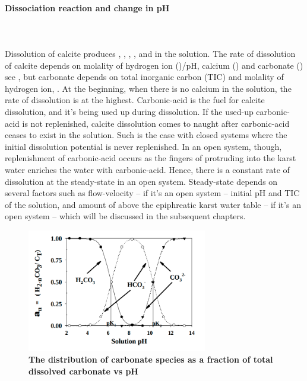 \paragraph*{Dissociation reaction and change in pH}\mbox{}\\ \\
Dissolution of calcite produces , , , , and  in the solution. 
The rate of dissolution of calcite depends on molality of hydrogen ion ()/pH, calcium () and 
carbonate () see , but carbonate depends on total inorganic carbon (TIC) and 
molality of hydrogen ion, . At the beginning, when there is no calcium in the solution, the rate of dissolution is at the highest. 
Carbonic-acid is the fuel for calcite dissolution, and it's being used up during dissolution. 
If the used-up carbonic-acid is not replenished, calcite dissolution comes to naught after carbonic-acid ceases to exist in the solution. 
Such is the case with closed systems where the initial dissolution potential is never replenished. In an open system, though, replenishment of 
carbonic-acid occurs as the fingers of  protruding into the karst water enriches the water with carbonic-acid. Hence, there is a constant 
rate of dissolution at the steady-state in an open system. Steady-state depends on several factors such as flow-velocity -- if it's an open 
system -- initial pH and TIC of the solution, and amount of  above the epiphreatic karst water table -- if it's an open system -- which will be 
discussed in  the subsequent chapters. \\

\begin{figure}
\centering
\includegraphics[width=0.7\textwidth]{PICTURES/dissolutionKinetics.png}
\caption [The distribution of carbonate species as a fraction of total dissolved carbonate vs pH \cite{butler1991carbon}]{\textbf{The distribution of carbonate species as a fraction of total dissolved carbonate vs pH \cite{butler1991carbon}}}
\label{fig:dissKinetics}
\end{figure}

